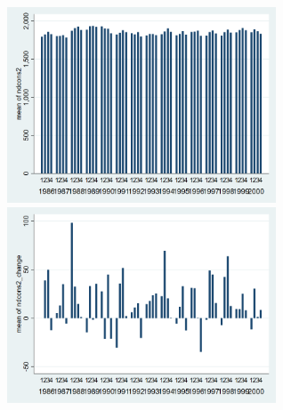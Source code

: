 \documentclass[12pt,a4paper]{article}
\begin{document}
\begin{center}
\includegraphics[width=8cm]{ndcons2_quarterly.png}
\includegraphics[width=8cm]{ndcons2_change_quarterly.png}\\
\end{center}
\end{document}
